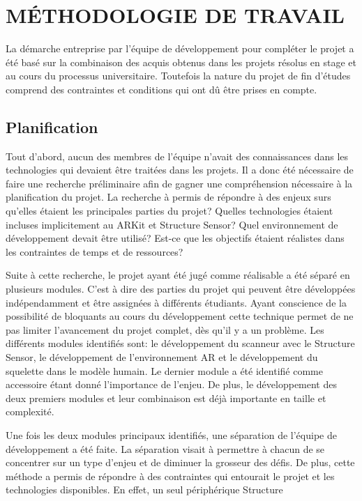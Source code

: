 \documentclass[letterpaper,twoside,12pt,french]{report}
\begin{document}
\chapter*{\uppercase{Méthodologie de travail}}
La démarche entreprise par l’équipe de développement pour compléter le projet a été basé sur la
combinaison des acquis obtenus dans les projets résolus en stage et au cours du processus
universitaire. Toutefois la nature du projet de fin d’études comprend des contraintes et conditions
qui ont dû être prises en compte.
\section*{Planification}
Tout d’abord, aucun des membres de l’équipe n'avait des connaissances dans les technologies qui
devaient être traitées dans les projets. Il a donc été nécessaire de faire une recherche
préliminaire afin de gagner une compréhension nécessaire à la planification du projet. La
recherche à permis de répondre à des enjeux surs qu’elles étaient les principales parties du projet?
Quelles technologies étaient incluses implicitement au ARKit et Structure Sensor? Quel environnement
de développement devait être utilisé? Est-ce que les objectifs étaient réalistes dans les
contraintes de temps et de ressources?
\par
Suite à cette recherche, le projet ayant été jugé comme réalisable a été séparé en plusieurs modules.
C’est à dire des parties du projet qui peuvent être développées indépendamment et être assignées à
différents étudiants. Ayant conscience de la possibilité de bloquants au cours du développement
cette technique permet de ne pas limiter l’avancement du projet complet, dès qu’il y a un problème.
Les différents modules identifiés sont: le développement du scanneur avec le Structure Sensor, le
développement de l’environnement AR et le développement du squelette dans le modèle humain. Le
dernier module a été identifié comme accessoire étant donné l’importance de l’enjeu. De plus, le
développement des deux premiers modules et leur combinaison est déjà importante en taille et
complexité.
\par
Une fois les deux modules principaux identifiés, une séparation de l'équipe de développement a été
faite. La séparation visait à permettre à chacun de se concentrer sur un type d'enjeu et de
diminuer la grosseur des défis. De plus, cette méthode a permis de répondre à des contraintes qui
entourait le projet et les technologies disponibles. En effet, un seul périphérique Structure
\end{document}
